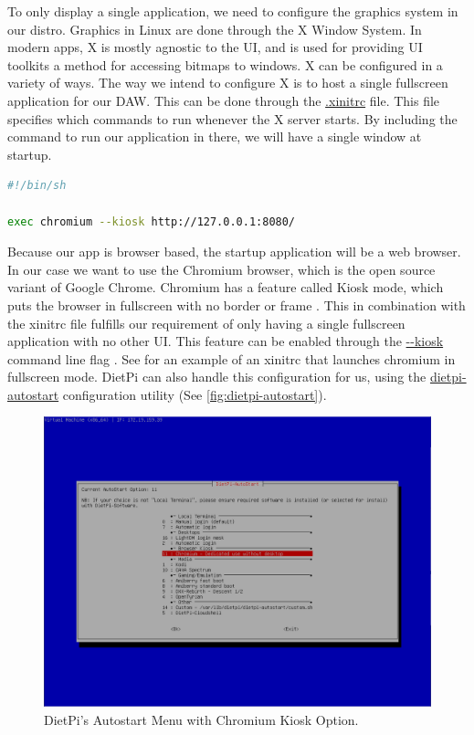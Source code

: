To only display a single application, we need to configure the graphics system in our
distro. Graphics in Linux are done through the X Window System. In modern apps, X is
mostly agnostic to the UI, and is used for providing UI toolkits a method for accessing
bitmaps to windows. X can be configured in a variety of ways. The way we intend to
configure X is to host a single fullscreen application for our DAW. This can be done
through the \url{.xinitrc} file. This file specifies which commands to run whenever the X
server starts. By including the command to run our application in there, we will have a
single window at startup.

\begin{lstlisting}[language=bash, label={lst:xinitrc}, caption=Example .xinitrc]
#!/bin/sh

exec chromium --kiosk http://127.0.0.1:8080/
\end{lstlisting}

Because our app is browser based, the startup application will be a web browser. In our
case we want to use the Chromium browser, which is the open source variant of Google
Chrome. Chromium has a feature called Kiosk mode, which puts the browser in fullscreen
with no border or frame \autocite{chromiumKioskMode}. This in combination with the xinitrc
file fulfills our requirement of only having a single fullscreen application with no other
UI. This feature can be enabled through the \url{--kiosk} command line flag
\autocite{chromiumKioskMode}. See  for an example of an xinitrc that
launches chromium in fullscreen mode. DietPi can also handle this configuration for us,
using the \url{dietpi-autostart} configuration utility (See
\autoref{fig:dietpi-autostart}).

\begin{figure}[h!]
  \centering
  \includegraphics[width=\linewidth]{image/dietpi-autostart.png}
  \caption{DietPi's Autostart Menu with Chromium Kiosk Option.}
  \label{fig:dietpi-autostart}
\end{figure}

